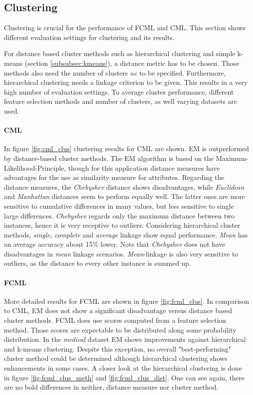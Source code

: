 		\subsection{Clustering}
			\label{subsec:eval_clustering}

			Clustering is crucial for the performance of FCML and CML. This section shows different evaluation settings for clustering and its results.

			For distance based cluster methods such as hierarchical clustering and simple k-means (section \ref{subsubsec:kmeans}), a distance metric has to be chosen. Those methods also need the number of clusters $nc$ to be specified. Furthermore, hierarchical clustering needs a linkage criterion to be given. This results in a very high number of evaluation settings. To average cluster performance, different feature selection methods and number of clusters, as well varying datasets are used.

				\paragraph{CML} In figure \ref{fig:cml_clus} clustering results for CML are shown. EM is outperformed by distance-based cluster methods. The EM algorithm is based on the Maximum-Likelihood-Principle, though for this application distance measures have advantages for the use as similarity measure for attributes. Regarding the distance measures, the \textit{Chebyshev} distance shows disadvantages, while \textit{Euclidean} and \textit{Manhattan} distances seem to perform equally well. The latter ones are more sensitive to cumulative differences in many values, but less sensitive to single large differences. \textit{Chebyshev} regards only the maximum distance between two instances, hence it is very receptive to outliers. Considering hierarchical cluster methods, \textit{single, complete} and \textit{average} linkage show equal performance. \textit{Mean} has an average accuracy about 15\% lower. Note that \textit{Chebyshev} does not have disadvantages in \textit{mean} linkage scenarios. \textit{Mean}-linkage is also very sensitive to outliers, as the distance to every other instance is summed up.

				\paragraph{FCML} More detailed results for FCML are shown in figure \ref{fig:fcml_clus}. In comparison to CML, EM does not show a significant disadvantage versus distance based cluster methods. FCML does use scores computed from a feature selection method. Those scores are expectable to be distributed along some probability distribution. In the \textit{medical} dataset EM shows improvements against hierarchical and k-means clustering. Despite this exception, no overall "best-performing" cluster method could be determined although hierarchical clustering shows enhancements in some cases. A closer look at the hierarchical clustering is done in figure \ref{fig:fcml_clus_meth} and \ref{fig:fcml_clus_dist}. One can see again, there are no bold differences in neither, distance measure nor cluster method. 


